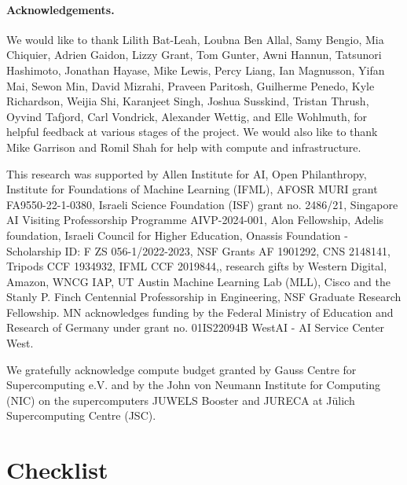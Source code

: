 \documentclass{article}
\newif\ifpreprint
\newcommand{\smallsec}[1]{\paragraph{#1}}
\begin{document}
\clearpage

\smallsec{Acknowledgements.} We would like to thank
Lilith Bat-Leah,
Loubna Ben Allal,
Samy Bengio,
Mia Chiquier,
Adrien Gaidon,
Lizzy Grant,
Tom Gunter,
Awni Hannun,
Tatsunori Hashimoto,
Jonathan Hayase,
Mike Lewis,
Percy Liang,
Ian Magnusson,
Yifan Mai,
Sewon Min,
David Mizrahi,
Praveen Paritosh,
Guilherme Penedo,
Kyle Richardson,
Weijia Shi,
Karanjeet Singh,
Joshua Susskind,
Tristan Thrush,
Oyvind Tafjord,
Carl Vondrick,
Alexander Wettig,
and
Elle Wohlmuth,
for helpful feedback at various stages of the project.
We would also like to thank Mike Garrison and Romil Shah for help with compute and infrastructure.

This research was supported by
Allen Institute for AI,
Open Philanthropy,
Institute for Foundations of Machine Learning (IFML),
AFOSR MURI grant FA9550-22-1-0380,
Israeli Science Foundation (ISF) grant no. 2486/21,
Singapore AI Visiting Professorship Programme AIVP-2024-001,
Alon Fellowship,
Adelis foundation,
Israeli Council for Higher Education,
Onassis Foundation - Scholarship ID: F ZS 056-1/2022-2023,
NSF Grants AF 1901292,
CNS 2148141,
Tripods CCF 1934932,
IFML CCF 2019844,,
research gifts by Western Digital, Amazon, WNCG IAP, UT Austin Machine Learning Lab (MLL), Cisco and the Stanly P. Finch Centennial Professorship in Engineering,
NSF Graduate Research Fellowship.
MN acknowledges funding by the Federal Ministry of Education and Research of Germany under grant no. 01IS22094B WestAI - AI Service Center West.

We gratefully acknowledge compute budget granted by Gauss Centre for Supercomputing e.V. and by the John von Neumann Institute for Computing (NIC) on the supercomputers JUWELS Booster and JURECA at Jülich Supercomputing Centre (JSC).



\clearpage

\clearpage
\ifpreprint
\else
\section*{Checklist}
\end{document}

